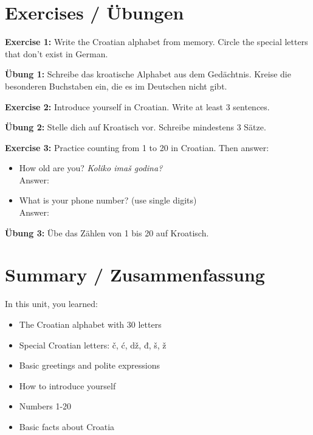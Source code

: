 \section{Exercises / Übungen}

\begin{exercise}
\textbf{Exercise 1:} Write the Croatian alphabet from memory. Circle the special letters that don't exist in German.

\textbf{Übung 1:} Schreibe das kroatische Alphabet aus dem Gedächtnis. Kreise die besonderen Buchstaben ein, die es im Deutschen nicht gibt.

\vspace{3cm}

\textbf{Exercise 2:} Introduce yourself in Croatian. Write at least 3 sentences.

\textbf{Übung 2:} Stelle dich auf Kroatisch vor. Schreibe mindestens 3 Sätze.

\vspace{3cm}

\textbf{Exercise 3:} Practice counting from 1 to 20 in Croatian. Then answer:
\begin{itemize}
    \item How old are you? \textit{Koliko imaš godina?} \\
    Answer: \underline{\hspace{5cm}}
    \item What is your phone number? (use single digits) \\
    Answer: \underline{\hspace{5cm}}
\end{itemize}

\textbf{Übung 3:} Übe das Zählen von 1 bis 20 auf Kroatisch.

\vspace{2cm}
\end{exercise}

\section{Summary / Zusammenfassung}

In this unit, you learned:
\begin{itemize}
    \item The Croatian alphabet with 30 letters
    \item Special Croatian letters: č, ć, dž, đ, š, ž
    \item Basic greetings and polite expressions
    \item How to introduce yourself
    \item Numbers 1-20
    \item Basic facts about Croatia
\end{itemize}

